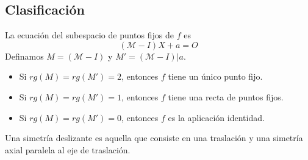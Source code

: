 \documentclass{./Geometria.tex}
\begin{document}
\subsection{Clasificación}
La ecuación del subespacio de puntos fijos de $f$ es
\[
	(\mathcal{M}-I)X +a = O
\]
Definamos $M= (\mathcal{M}-I)$ y $M'=(\mathcal{M}-I)|a$.
\begin{itemize}
	\item Si $rg(M) =rg(M') = 2$, entonces $f$ tiene un único punto fijo.
	\item Si $rg(M) = rg(M') = 1$, entonces $f$ tiene una recta de puntos fijos.
	\item Si $rg(M) = rg(M') = 0$, entonces $f$ es la aplicación identidad.  
\end{itemize}
\begin{defin}
Una simetría deslizante es aquella que consiste en una traslación y una simetría axial paralela al eje de traslación.
\end{defin}
\end{document}
